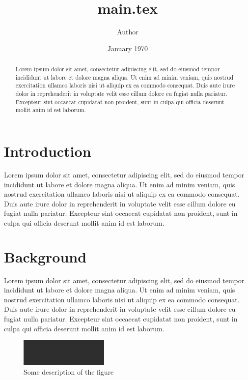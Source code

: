 \documentclass{paper}
\begin{document}
\title{main.tex}
\author{Author}
\date{January 1970}
\maketitle


\begin{abstract}
  Lorem ipsum dolor sit amet, consectetur adipiscing elit, sed do eiusmod
  tempor incididunt ut labore et dolore magna aliqua. Ut enim ad minim veniam,
  quis nostrud exercitation ullamco laboris nisi ut aliquip ex ea commodo
  consequat. Duis aute irure dolor in reprehenderit in voluptate velit esse
  cillum dolore eu fugiat nulla pariatur. Excepteur sint occaecat cupidatat non
  proident, sunt in culpa qui officia deserunt mollit anim id est laborum.
\end{abstract}


\section{Introduction}
  Lorem ipsum dolor sit amet, consectetur adipiscing elit, sed do eiusmod
  tempor incididunt ut labore et dolore magna aliqua. Ut enim ad minim veniam,
  quis nostrud exercitation ullamco laboris nisi ut aliquip ex ea commodo
  consequat. Duis aute irure dolor in reprehenderit in voluptate velit esse
  cillum dolore eu fugiat nulla pariatur. Excepteur sint occaecat cupidatat non
  proident, sunt in culpa qui officia deserunt mollit anim id est laborum.
  \cite{latex2e}

\section{Background}
  Lorem ipsum dolor sit amet, consectetur adipiscing elit, sed do eiusmod
  tempor incididunt ut labore et dolore magna aliqua. Ut enim ad minim veniam,
  quis nostrud exercitation ullamco laboris nisi ut aliquip ex ea commodo
  consequat. Duis aute irure dolor in reprehenderit in voluptate velit esse
  cillum dolore eu fugiat nulla pariatur. Excepteur sint occaecat cupidatat non
  proident, sunt in culpa qui officia deserunt mollit anim id est laborum.
  \cite{texbook}

  \begin{figure}[H]
    \includegraphics[width=\linewidth]{blank.png}
    \caption{Some description of the figure}
    \label{fig:blank}
  \end{figure}


\pagebreak
\printbibliography

\end{document}
